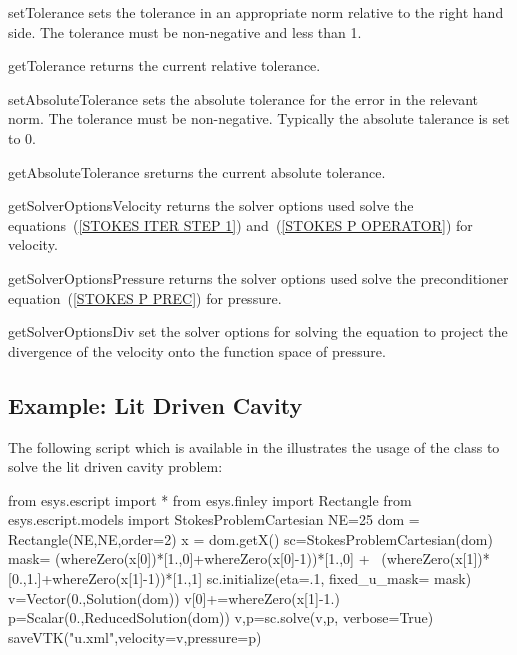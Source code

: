 \begin{methoddesc}[StokesProblemCartesian]{setTolerance}{}
sets the tolerance in an appropriate norm relative to the right hand side. The tolerance must be non-negative and less than 1.
\end{methoddesc}
\begin{methoddesc}[StokesProblemCartesian]{getTolerance}{}
returns the current relative tolerance.
\end{methoddesc}
\begin{methoddesc}[StokesProblemCartesian]{setAbsoluteTolerance}{}
sets the absolute tolerance for the error in the relevant norm. The tolerance must be non-negative. Typically the
absolute talerance is set to 0.
\end{methoddesc}

\begin{methoddesc}[StokesProblemCartesian]{getAbsoluteTolerance}{}
sreturns the current absolute tolerance.
\end{methoddesc}

\begin{methoddesc}[StokesProblemCartesian]{getSolverOptionsVelocity}{}
returns the solver options used  solve the equations~(\ref{STOKES ITER STEP 1}) and~(\ref{STOKES P OPERATOR}) for velocity.
\end{methoddesc}

\begin{methoddesc}[StokesProblemCartesian]{getSolverOptionsPressure}{}
returns the solver options used solve the preconditioner equation~(\ref{STOKES P PREC}) for pressure.
\end{methoddesc}

\begin{methoddesc}[StokesProblemCartesian]{getSolverOptionsDiv}{}
set the solver options for solving the equation to project the divergence of the velocity onto the function space of pressure.
\end{methoddesc}


\subsection{Example: Lit Driven Cavity}
 The following script  
 which is available in the \ExampleDirectory
illustrates the usage of the  class to solve
the lit driven cavity problem:
\begin{python}
from esys.escript import *
from esys.finley import Rectangle
from esys.escript.models import StokesProblemCartesian
NE=25
dom = Rectangle(NE,NE,order=2)
x = dom.getX()
sc=StokesProblemCartesian(dom)
mask= (whereZero(x[0])*[1.,0]+whereZero(x[0]-1))*[1.,0] + \
      (whereZero(x[1])*[0.,1.]+whereZero(x[1]-1))*[1.,1]
sc.initialize(eta=.1, fixed_u_mask= mask)
v=Vector(0.,Solution(dom))
v[0]+=whereZero(x[1]-1.)
p=Scalar(0.,ReducedSolution(dom))
v,p=sc.solve(v,p, verbose=True)
saveVTK("u.xml",velocity=v,pressure=p)
\end{python}
